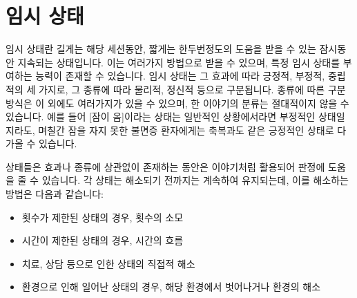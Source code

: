 \documentclass[12pt]{report}
\begin{document}
	\section*{임시 상태}
	임시 상태란 길게는 해당 세션동안, 짧게는 한두번정도의 도움을 받을 수 있는 잠시동안 지속되는 상태입니다. 이는 여러가지 방법으로 받을 수 있으며, 특정 임시 상태를 부여하는 능력이 존재할 수 있습니다. 임시 상태는 그 효과에 따라 긍정적, 부정적, 중립적의 세 가지로, 그 종류에 따라 물리적, 정신적 등으로 구분됩니다. 종류에 따른 구분 방식은 이 외에도 여러가지가 있을 수 있으며, 한 이야기의 분류는 절대적이지 않을 수 있습니다. 예를 들어 [잠이 옴]이라는 상태는 일반적인 상황에서라면 부정적인 상태일지라도, 며칠간 잠을 자지 못한 불면증 환자에게는 축복과도 같은 긍정적인 상태로 다가올 수 있습니다.
	
	상태들은 효과나 종류에 상관없이 존재하는 동안은 이야기처럼 활용되어 판정에 도움을 줄 수 있습니다. 각 상태는 해소되기 전까지는 계속하여 유지되는데, 이를 해소하는 방법은 다음과 같습니다:
	\begin{itemize}
		\item 횟수가 제한된 상태의 경우, 횟수의 소모
		\item 시간이 제한된 상태의 경우, 시간의 흐름
		\item 치료, 상담 등으로 인한 상태의 직접적 해소
		\item 환경으로 인해 일어난 상태의 경우, 해당 환경에서 벗어나거나 환경의 해소
	\end{itemize}
	
\end{document}

